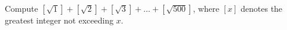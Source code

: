 Compute $\left[\sqrt{1}\right]+\left[\sqrt{2}\right]+\left[\sqrt{3}\right]+\ldots+\left[\sqrt{500}\right]$, where $[x]$ denotes the greatest integer not exceeding $x$.
